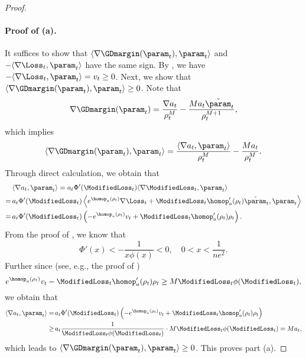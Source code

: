 \begin{proof}
\paragraph{Proof of (a).} It suffices to show that $\langle \nabla \GDmargin(\param_t), \param_t \rangle$ and $- \langle \nabla \Loss_t, \param_t \rangle$ have the same sign. By , we have $- \langle \nabla \Loss_t, \param_t \rangle = v_t \ge 0$. Next, we show that $\langle \nabla \GDmargin(\param_t), \param_t \rangle \ge 0$. Note that
\begin{equation*}
    \nabla \GDmargin (\param_t) = \frac{\nabla a_t}{\rho_t^M} - \frac{M a_t \tilde{\param}_t}{\rho_t^{M+1}},
\end{equation*}
which implies
\begin{equation*}
    \langle \nabla \GDmargin(\param_t), \param_t \rangle = \frac{\langle \nabla a_t, \param_t \rangle}{\rho_t^M} - \frac{M a_t}{\rho_t^{M}}.
\end{equation*}
Through direct calculation, we obtain that
\begin{align*}
    & \langle \nabla a_t, \param_t \rangle = a_t \Phi' (\ModifiedLoss_t) \langle \nabla \ModifiedLoss_t, \param_t \rangle \\
    = \, & a_t \Phi' (\ModifiedLoss_t) \left\langle e^{\homop_a (\rho_t)} \nabla \Loss_t + \ModifiedLoss_t \homop_a' (\rho_t) \tilde{\param}_t, \param_t \right\rangle \\
    = \, & a_t \Phi' (\ModifiedLoss_t) \left( - e^{\homop_a (\rho_t)} v_t + \ModifiedLoss_t \homop_a' (\rho_t) \rho_t \right).
\end{align*}
From the proof of , we know that
\begin{equation*}
     \Phi'(x) < - \frac{1}{x \phi(x)} < 0, \quad 0 < x < \frac{1}{n e^2}.
\end{equation*}
Further since (see, e.g., the proof of )
\begin{equation*}
    e^{\homop_a (\rho_t)} v_t - \ModifiedLoss_t \homop_a' (\rho_t) \rho_t \ge M \ModifiedLoss_t \phi(\ModifiedLoss_t),
\end{equation*}
we obtain that
\begin{align*}
    \langle \nabla a_t, \param_t \rangle = \, & a_t \Phi' (\ModifiedLoss_t) \left( - e^{\homop_a (\rho_t)} v_t + \ModifiedLoss_t \homop_a' (\rho_t) \rho_t \right) \\
    \ge \, & a_t \frac{1}{\ModifiedLoss_t \phi(\ModifiedLoss_t)} \cdot M \ModifiedLoss_t \phi(\ModifiedLoss_t) = M a_t,
\end{align*}
which leads to $\langle \nabla \GDmargin(\param_t), \param_t \rangle \ge 0$. This proves part (a).


\end{proof}
